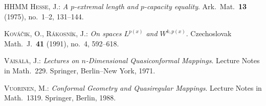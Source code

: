 \documentclass[12pt]{amsart}
\numberwithin{equation}{section}
\theoremstyle{plain}
\theoremstyle{definition}
\begin{document}
\begin{thebibliography}{HHMM}
{\small \textsc{Hesse, J.:}
\textit{A $p$-extremal length and $p$-capacity equality}.
Ark.\ Mat.\ \textbf{13} (1975), no.~1--2, 131--144.}

{\small \textsc{Kov\'a\v{c}ik, O., R\'akosn\'ik, J.:}
\textit{On spaces $L^{p(x)}$ and $W^{k,p(x)}$}.
Czechoslovak Math.\ J.\ \textbf{41} (1991), no.~4, 592--618.}


{\small \textsc{V\"ais\"al\"a, J.:}
\textit{Lectures on $n$-Dimensional Quasiconformal Mappings}.
Lecture Notes in Math.\ 229.
Springer, Berlin--New York, 1971.}

{\small \textsc{Vuorinen, M.:}
\textit{Conformal Geometry and Quasiregular Mappings}.
Lecture Notes in Math.\ 1319.
Springer, Berlin, 1988.}


\end{thebibliography}
\end{document}
